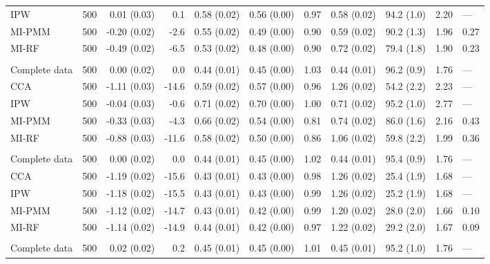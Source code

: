 \begin{longtable}{l|rrrrrrrrrl}
IPW & 500 & 0.01 (0.03) & 0.1 & 0.58 (0.02) & 0.56 (0.00) & 0.97 & 0.58 (0.02) & 94.2 (1.0) & 2.20 & — \\ 
MI-PMM & 500 & -0.20 (0.02) & -2.6 & 0.55 (0.02) & 0.49 (0.00) & 0.90 & 0.59 (0.02) & 90.2 (1.3) & 1.96 & 0.27 \\ 
MI-RF & 500 & -0.49 (0.02) & -6.5 & 0.53 (0.02) & 0.48 (0.00) & 0.90 & 0.72 (0.02) & 79.4 (1.8) & 1.90 & 0.23 \\ 
\midrule\addlinespace[2.5pt]
\multicolumn{11}{l}{Wasting — MAR-strong 50\%} \\[2.5pt] 
\midrule\addlinespace[2.5pt]
Complete data & 500 & 0.00 (0.02) & 0.0 & 0.44 (0.01) & 0.45 (0.00) & 1.03 & 0.44 (0.01) & 96.2 (0.9) & 1.76 & — \\ 
CCA & 500 & -1.11 (0.03) & -14.6 & 0.59 (0.02) & 0.57 (0.00) & 0.96 & 1.26 (0.02) & 54.2 (2.2) & 2.23 & — \\ 
IPW & 500 & -0.04 (0.03) & -0.6 & 0.71 (0.02) & 0.70 (0.00) & 1.00 & 0.71 (0.02) & 95.2 (1.0) & 2.77 & — \\ 
MI-PMM & 500 & -0.33 (0.03) & -4.3 & 0.66 (0.02) & 0.54 (0.00) & 0.81 & 0.74 (0.02) & 86.0 (1.6) & 2.16 & 0.43 \\ 
MI-RF & 500 & -0.88 (0.03) & -11.6 & 0.58 (0.02) & 0.50 (0.00) & 0.86 & 1.06 (0.02) & 59.8 (2.2) & 1.99 & 0.36 \\ 
\midrule\addlinespace[2.5pt]
\multicolumn{11}{l}{Wasting — MNAR 10\%} \\[2.5pt] 
\midrule\addlinespace[2.5pt]
Complete data & 500 & 0.00 (0.02) & 0.0 & 0.44 (0.01) & 0.45 (0.00) & 1.02 & 0.44 (0.01) & 95.4 (0.9) & 1.76 & — \\ 
CCA & 500 & -1.19 (0.02) & -15.6 & 0.43 (0.01) & 0.43 (0.00) & 0.98 & 1.26 (0.02) & 25.4 (1.9) & 1.68 & — \\ 
IPW & 500 & -1.18 (0.02) & -15.5 & 0.43 (0.01) & 0.43 (0.00) & 0.99 & 1.26 (0.02) & 25.2 (1.9) & 1.68 & — \\ 
MI-PMM & 500 & -1.12 (0.02) & -14.7 & 0.43 (0.01) & 0.42 (0.00) & 0.99 & 1.20 (0.02) & 28.0 (2.0) & 1.66 & 0.10 \\ 
MI-RF & 500 & -1.14 (0.02) & -14.9 & 0.44 (0.01) & 0.42 (0.00) & 0.97 & 1.22 (0.02) & 29.2 (2.0) & 1.67 & 0.09 \\ 
\midrule\addlinespace[2.5pt]
\multicolumn{11}{l}{Wasting — MNAR 30\%} \\[2.5pt] 
\midrule\addlinespace[2.5pt]
Complete data & 500 & 0.02 (0.02) & 0.2 & 0.45 (0.01) & 0.45 (0.00) & 1.01 & 0.45 (0.01) & 95.2 (1.0) & 1.76 & — \\ 

\end{longtable}
